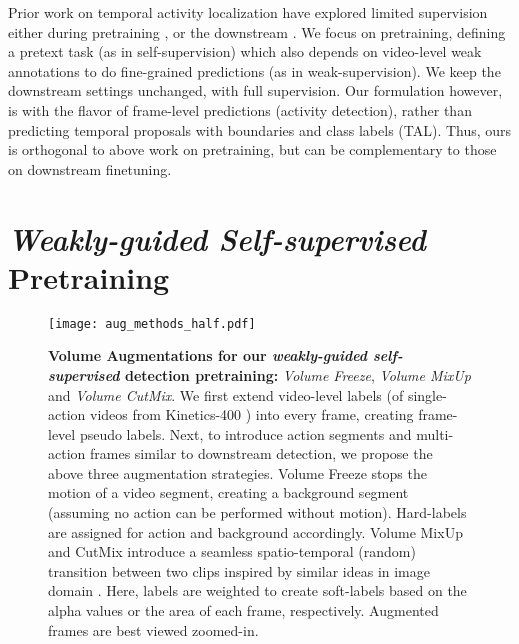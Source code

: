 \documentclass[letterpaper]{article} \usepackage{aaai23}  \usepackage{times}  \usepackage{helvet}  \usepackage{courier}  \usepackage[hyphens]{url}  \usepackage{graphicx} \urlstyle{rm} \def\UrlFont{\rm}  \usepackage{natbib}  \usepackage{caption} \frenchspacing  \setlength{\pdfpagewidth}{8.5in}  \setlength{\pdfpageheight}{11in}  \usepackage{algorithm}
\newcommand{\ch}{}
\begin{document}
Prior work on temporal activity localization have explored limited supervision either during pretraining \cite{zhang2022unsupervised, xu2021boundary, alwassel2021tsp, xu2021low}, or the downstream \cite{richard2017weakly, nguyen2018weakly, liu2019weakly, yu2019temporal, liu2019completeness, shi2020weakly}. We focus on pretraining, defining a pretext task (as in self-supervision) which also depends on video-level weak annotations to do fine-grained predictions (as in weak-supervision). We keep the downstream settings unchanged, with full supervision. Our formulation however, is with the flavor of frame-level predictions (activity detection), rather than predicting temporal proposals with boundaries and class labels (TAL). Thus, ours is orthogonal to above work on pretraining, but can be complementary to those on downstream finetuning.




\section{\ch{\textit{{Weakly-guided Self-supervised}}} Pretraining}
\label{method}

\begin{figure}[t]
	\centering
	\texttt{[image: aug\_methods\_half.pdf]}
	\caption{\textbf{Volume Augmentations for our \ch{\textit{weakly-guided self-supervised}} detection pretraining:} \textit{Volume Freeze}, \textit{Volume MixUp} and \textit{Volume CutMix}. We first extend video-level labels (of single-action videos from Kinetics-400 \cite{carreira2017quo}) into every frame, creating frame-level pseudo labels. Next, to introduce action segments and multi-action frames similar to downstream detection, we propose the above three augmentation strategies. Volume Freeze stops the motion of a video segment, creating a background segment (assuming no action can be performed without motion). Hard-labels are assigned for action and background accordingly. Volume MixUp and CutMix introduce a seamless spatio-temporal (random) transition between two clips inspired by similar ideas in image domain \cite{zhang2017mixup, yun2019cutmix}. Here, labels are weighted to create soft-labels based on the alpha values or the area of each frame, respectively. Augmented frames are best viewed zoomed-in.}
	\label{fig:aug}
\end{figure}
\end{document}
